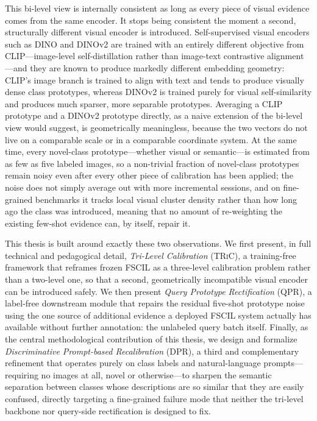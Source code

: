 \documentclass{iutbscthesis}
\begin{document}
This bi-level view is internally consistent as long as every piece of visual evidence comes from the same encoder. It stops being consistent the moment a second, structurally different visual encoder is introduced. Self-supervised visual encoders such as DINO and DINOv2 \autocite{caron2021emerging, oquab2023dinov2} are trained with an entirely different objective from CLIP---image-level self-distillation rather than image-text contrastive alignment---and they are known to produce markedly different embedding geometry: CLIP's image branch is trained to align with text and tends to produce visually dense class prototypes, whereas DINOv2 is trained purely for visual self-similarity and produces much sparser, more separable prototypes. Averaging a CLIP prototype and a DINOv2 prototype directly, as a naive extension of the bi-level view would suggest, is geometrically meaningless, because the two vectors do not live on a comparable scale or in a comparable coordinate system. At the same time, every novel-class prototype---whether visual or semantic---is estimated from as few as five labeled images, so a non-trivial fraction of novel-class prototypes remain noisy even after every other piece of calibration has been applied; the noise does not simply average out with more incremental sessions, and on fine-grained benchmarks it tracks local visual cluster density rather than how long ago the class was introduced, meaning that no amount of re-weighting the existing few-shot evidence can, by itself, repair it.

This thesis is built around exactly these two observations. We first present, in full technical and pedagogical detail, \emph{Tri-Level Calibration} (\textsc{TRiC}), a training-free framework that reframes frozen FSCIL as a three-level calibration problem rather than a two-level one, so that a second, geometrically incompatible visual encoder can be introduced safely. We then present \emph{Query Prototype Rectification} (QPR), a label-free downstream module that repairs the residual five-shot prototype noise using the one source of additional evidence a deployed FSCIL system actually has available without further annotation: the unlabeled query batch itself. Finally, as the central methodological contribution of this thesis, we design and formalize \emph{Discriminative Prompt-based Recalibration} (DPR), a third and complementary refinement that operates purely on class labels and natural-language prompts---requiring no images at all, novel or otherwise---to sharpen the semantic separation between classes whose descriptions are so similar that they are easily confused, directly targeting a fine-grained failure mode that neither the tri-level backbone nor query-side rectification is designed to fix.
\end{document}
